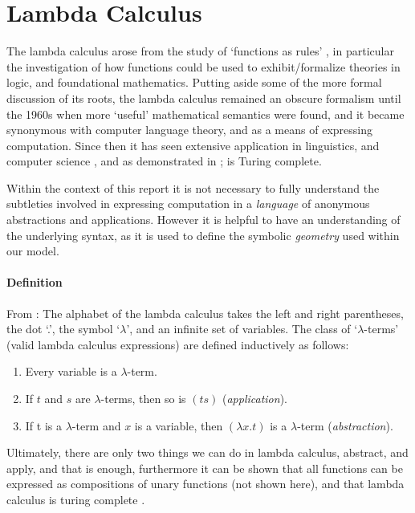 \documentclass{report}
\begin{document}
\section{Lambda Calculus}
\label{sec:lambda_calculus}
The lambda calculus arose from the study of \lq{}functions as rules\rq{} \cite{sep-lambda-calculus}, in particular the investigation of how functions could be used to exhibit/formalize theories in logic, and foundational mathematics.
Putting aside some of the more formal discussion of its roots, the lambda calculus remained an obscure formalism until the 1960s when more \lq{}useful\rq{} mathematical semantics were found, and it became synonymous with computer language theory, and as a means of expressing computation.
Since then it has seen extensive application in linguistics, and computer science \cite{heim1998semantics}, and as demonstrated in \cite{Turing1937}; is Turing complete.	

Within the context of this report it is not necessary to fully understand the subtleties involved in expressing computation in a \emph{language} of anonymous abstractions and applications.
However it is helpful to have an understanding of the underlying syntax, as it is used to define the symbolic \emph{geometry} used within our model.

\paragraph{Definition} From \cite{sep-lambda-calculus}: The alphabet of the lambda calculus takes the left and right parentheses, the dot \lq{}.\rq{}, the symbol \lq{}$\lambda$\rq{}, and an infinite set of variables.
The class of \lq{}$\lambda$-terms\rq{} (valid lambda calculus expressions) are defined inductively as follows:
\begin{enumerate} 
\item Every variable is a $\lambda$-term.
\item If $t$ and $s$ are $\lambda$-terms, then so is $(ts)$ (\emph{application}).
\item If t is a $\lambda$-term and $x$ is a variable, then $(\lambda x.t)$ is a $\lambda$-term (\emph{abstraction}).
\end{enumerate}

Ultimately, there are only two things we can do in lambda calculus, abstract, and apply, and that is enough, furthermore it can be shown that all functions can be expressed as compositions of unary functions (not shown here), and that lambda calculus is turing complete \cite{Turing1937}.
\end{document}
